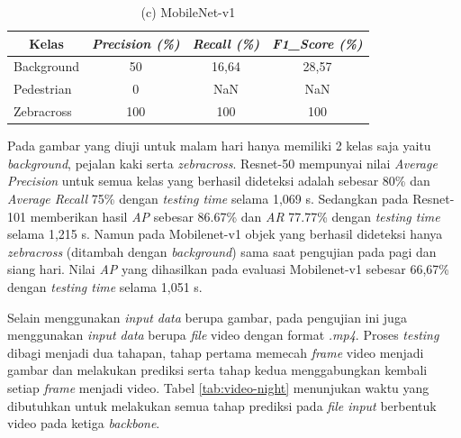 \begin{table}[H]
\begin{minipage}[b]{\textwidth}
	\end{minipage}
	\vfill
	\begin{minipage}[b]{\textwidth}
		\centering
		\caption*{(c) MobileNet-v1}
		\begin{tabular}{|l|c|c|c|}
			\hline
			\multicolumn{1}{|c|}{\textbf{Kelas}} & \textit{\textbf{Precision (\%)}} & \textit{\textbf{Recall (\%)}} & \textit{\textbf{F1\_Score (\%)}} \\ \hline
			Background                           & 50                               & 16,64                         & 28,57                               \\ \hline
			Pedestrian                           & 0                                & NaN                           & NaN                              \\ \hline
			Zebracross                           & 100                              & 100                            & 100                            \\ \hline
			
		\end{tabular}
		
	\end{minipage}
	
	\label{tab:evaluate-night}
\end{table}

Pada gambar yang diuji untuk malam hari hanya memiliki 2 kelas saja yaitu \textit{background}, pejalan kaki serta \textit{zebracross}. Resnet-50 mempunyai nilai \textit{Average Precision} untuk semua kelas yang berhasil dideteksi adalah sebesar 80\% dan \textit{Average Recall} 75\% dengan \textit{testing time} selama 1,069 s. Sedangkan pada Resnet-101 memberikan hasil \textit{AP} sebesar 86.67\% dan \textit{AR} 77.77\% dengan \textit{testing time} selama 1,215 s. Namun pada Mobilenet-v1 objek yang berhasil dideteksi hanya \textit{zebracross} (ditambah dengan \textit{background}) sama saat pengujian pada pagi dan siang hari. Nilai \textit{AP} yang dihasilkan pada evaluasi Mobilenet-v1 sebesar 66,67\% dengan \textit{testing time} selama 1,051 s.

Selain menggunakan \textit{input data} berupa gambar, pada pengujian ini juga menggunakan \textit{input data} berupa \textit{file} video dengan format \textit{.mp4}. Proses \textit{testing} dibagi menjadi dua tahapan, tahap pertama memecah \textit{frame} video menjadi gambar dan melakukan prediksi serta tahap kedua menggabungkan kembali setiap \textit{frame} menjadi video. Tabel \ref{tab:video-night} menunjukan waktu yang dibutuhkan untuk melakukan semua tahap prediksi pada \textit{file input} berbentuk video pada ketiga \textit{backbone}.


